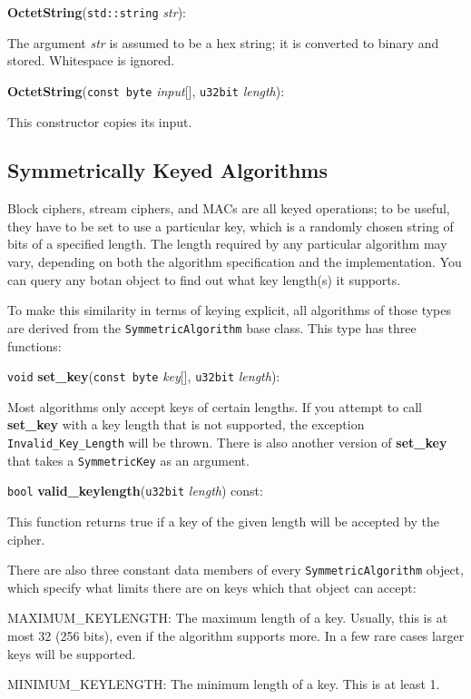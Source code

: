 \documentclass{article}
\newcommand{\function}[1]{\textbf{#1}}
\newcommand{\type}[1]{\texttt{#1}}
\renewcommand{\arg}[1]{\textsl{#1}}
\begin{document}
\noindent
\function{OctetString}(\type{std::string} \arg{str}):

The argument \arg{str} is assumed to be a hex string; it is converted to binary
and stored. Whitespace is ignored.

\noindent
\function{OctetString}(\type{const byte} \arg{input}[], \type{u32bit}
\arg{length}):

This constructor copies its input.

\subsection{Symmetrically Keyed Algorithms}

Block ciphers, stream ciphers, and MACs are all keyed operations; to
be useful, they have to be set to use a particular key, which is a
randomly chosen string of bits of a specified length.  The length
required by any particular algorithm may vary, depending on both the
algorithm specification and the implementation. You can query any
botan object to find out what key length(s) it supports.

To make this similarity in terms of keying explicit, all algorithms of
those types are derived from the \type{SymmetricAlgorithm} base
class. This type has three functions:

\noindent
\type{void} \function{set\_key}(\type{const byte} \arg{key}[], \type{u32bit}
\arg{length}):

Most algorithms only accept keys of certain lengths. If you attempt to call
\function{set\_key} with a key length that is not supported, the exception
\type{Invalid\_Key\_Length} will be thrown. There is also another version of
\function{set\_key} that takes a \type{SymmetricKey} as an argument.

\noindent
\type{bool} \function{valid\_keylength}(\type{u32bit} \arg{length}) const:

This function returns true if a key of the given length will be accepted by
the cipher.

There are also three constant data members of every
\type{SymmetricAlgorithm} object, which specify what limits there are
on keys which that object can accept:

MAXIMUM\_KEYLENGTH: The maximum length of a key. Usually, this is at
most 32 (256 bits), even if the algorithm supports more. In a few rare
cases larger keys will be supported.

MINIMUM\_KEYLENGTH: The minimum length of a key. This is at least 1.
\end{document}

